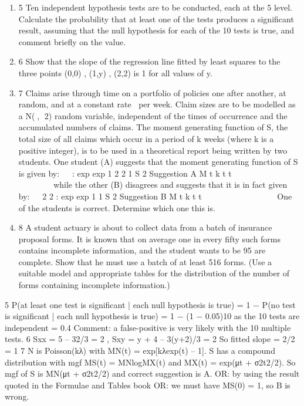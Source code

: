 \documentclass[a4paper,12pt]{article}
\begin{document}
\begin{enumerate}
\item
5 Ten independent hypothesis tests are to be conducted, each at the 5%
level.
Calculate the probability that at least one of the tests produces a significant result,
assuming that the null hypothesis for each of the 10 tests is true, and comment briefly
on the value. 
\item 6 Show that the slope of the regression line fitted by least squares to the three points
(0,0) , (1,y) , (2,2)
is 1 for all values of y. 
\item 7 Claims arise through time on a portfolio of policies one after another, at random, and
at a constant rate per week. Claim sizes are to be modelled as a N(, 2) random
variable, independent of the times of occurrence and the accumulated numbers of
claims.
The moment generating function of S, the total size of all claims which occur in a
period of k weeks (where k is a positive integer), is to be used in a theoretical report
being written by two students.
One student (A) suggests that the moment generating function of S is given by:
  : exp exp 1 2 2 1
S 2 Suggestion A M t k t t
       
 	 
    
    
while the other (B) disagrees and suggests that it is in fact given by:
  2 2 : exp exp 1 1
S 2 Suggestion B M t k t t      
    	  
 
   
One of the students is correct. Determine which one this is. 
\item 8 A student actuary is about to collect data from a batch of insurance proposal forms. It
is known that on average one in every fifty such forms contains incomplete
information, and the student wants to be 95%
are complete.
Show that he must use a batch of at least 516 forms. (Use a suitable model and
appropriate tables for the distribution of the number of forms containing incomplete
information.) 
\end{enumerate}
\newpage

5 P(at least one test is significant | each null hypothesis is true)
= 1 − P(no test is significant | each null hypothesis is true)
= 1 − (1 − 0.05)10 as the 10 tests are independent
= 0.4
Comment: a false-positive is very likely with the 10 multiple tests.
6 Sxx = 5 – 32/3 = 2 , Sxy = y + 4 – 3(y+2)/3 = 2
So fitted slope = 2/2 = 1
7 N is Poisson(kλ) with MN(t) = exp[kλ{exp(t) – 1}].
S has a compound distribution with mgf MS(t) = MN{logMX(t)}
and MX(t) = exp(μt + σ2t2/2).
So mgf of S is MN(μt + σ2t2/2) and correct suggestion is A.
OR: by using the result quoted in the Formulae and Tables book
OR: we must have MS(0) = 1, so B is wrong.
\end{document}
